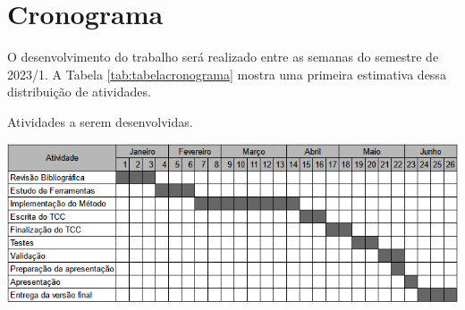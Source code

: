 \chapter{Cronograma}\label{cap:cronograma}

O desenvolvimento do trabalho será realizado entre as semanas do semestre de 2023/1. A Tabela \ref{tab:tabelacronograma} mostra uma primeira estimativa dessa distribuição de atividades.

\begin{table}[h]
    \caption{Atividades a serem desenvolvidas.}
    \centering
    \includegraphics[width=16cm]{figuras/Cronograma.png}
    \label{tab:tabelacronograma}
\end{table}